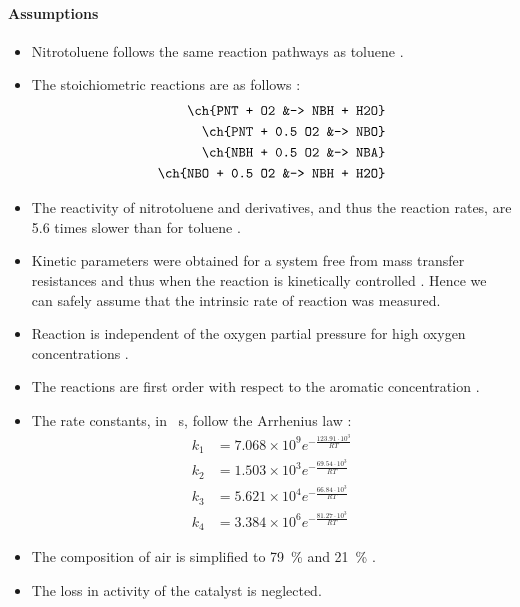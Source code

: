 \paragraph{Assumptions}
\begin{itemize}
    \item Nitrotoluene follows the same reaction pathways as toluene \cite{wendt_reaction_1986}.
    \item The stoichiometric reactions are as follows \cite{hoorn_modelling_2005}:
    \begin{align}
        \ch{PNT +      O2 &-> NBH + H2O} \\
        \ch{PNT +  0.5 O2 &-> NBO} \\
        \ch{NBH +  0.5 O2 &-> NBA} \\
        \ch{NBO +  0.5 O2 &-> NBH + H2O}
    \end{align}
    \item The reactivity of nitrotoluene and derivatives, and thus the reaction rates, are 5.6 times slower than for toluene \cite{partenheimer_methodology_1995}.
    \item Kinetic parameters were obtained for a system free from mass transfer resistances and thus when the reaction is kinetically controlled \cite{chandalia_kinetics_1999}. Hence we can safely assume that the intrinsic rate of reaction was measured.
    \item Reaction is independent of the oxygen partial pressure for high oxygen concentrations \cite{tan_kinetic_2010}.
    \item The reactions are first order with respect to the aromatic concentration \cite{chandalia_kinetics_1999}.
    \item The rate constants, in \si{\per\s}, follow the Arrhenius law \cite{tan_kinetic_2010}:
        \begin{align}
            k_1&=7.068 \times 10^9 e^{-\frac{123.91\cdot 10^{3}}{RT}}\\
            k_2&=1.503 \times 10^3 e^{-\frac{69.54 \cdot 10^{3}}{RT}}\\
            k_3&=5.621 \times 10^4 e^{-\frac{66.84 \cdot 10^{3}}{RT}}\\
            k_4&=3.384 \times 10^6 e^{-\frac{81.27 \cdot 10^{3}}{RT}}
        \end{align}    
    \item The composition of air is simplified to \SI{79}{\percent}  and \SI{21}{\percent} .
    \item The loss in activity of the catalyst is neglected.
\end{itemize}

